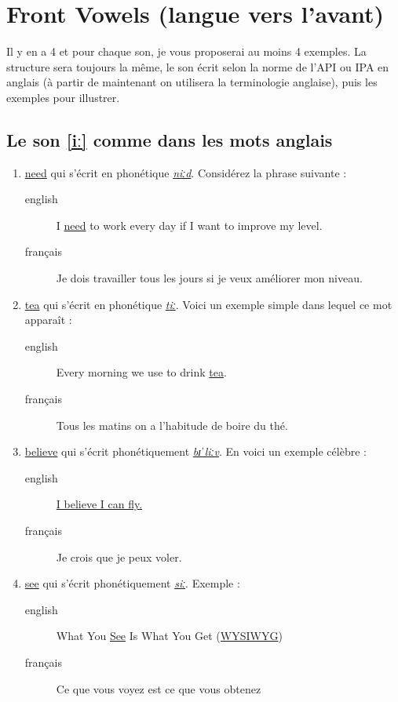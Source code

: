\documentclass[12pt,a4paper]{book}
\begin{document}
\section{\textenglish{Front Vowels} (langue vers l'avant)}
\label{sec:orge433061}
Il y en a 4 et pour chaque son, je vous proposerai au moins 4
exemples. La structure sera toujours la même, le son écrit selon la
norme de l'API ou IPA en anglais (à partir de maintenant on utilisera
la terminologie anglaise), puis les exemples pour illustrer.
\subsection{Le son \href{https://youtu.be/EuZa9-QbhG8}{[iː]} comme dans les mots anglais}
\label{sec:org62768e9}
\begin{enumerate}
\item \href{http://www.wordreference.com/enfr/need}{need} qui s'écrit en phonétique \href{https://en.oxforddictionaries.com/definition/need}{\emph{niːd}}. Considérez la
phrase suivante :
\begin{description}
\item[{english}] \textenglish{I \href{https://youtu.be/p0quLJutRC8}{need} to work every day if I want to improve my level.}
\item[{français}] Je dois travailler tous les jours si je veux
améliorer mon niveau.
\end{description}
\item \href{http://www.wordreference.com/enfr/tea}{tea} qui s'écrit en phonétique \href{https://en.oxforddictionaries.com/definition/tea}{\emph{tiː}}. Voici un exemple simple dans
lequel ce mot apparaît :
\begin{description}
\item[{english}] \textenglish{Every morning we use to drink \href{https://youtu.be/Euh8dY4EU9o}{tea}.}
\item[{français}] Tous les matins on a l'habitude de boire du thé.
\end{description}
\item \href{http://www.wordreference.com/enfr/believe}{believe} qui s'écrit phonétiquement \href{https://en.oxforddictionaries.com/definition/believe}{\emph{bɪˈliːv}}. En voici un exemple
célèbre :
\begin{description}
\item[{english}] \href{https://youtu.be/GIQn8pab8Vc}{\textenglish{I believe I can fly.}}
\item[{français}] Je crois que je peux voler.
\end{description}
\item \href{http://www.wordreference.com/enfr/see}{see} qui s'écrit phonétiquement \href{https://en.oxforddictionaries.com/definition/see}{\emph{siː}}. Exemple :
\begin{description}
\item[{english}] \textenglish{What You \href{https://youtu.be/Dpf2yHjBVYM}{See} Is What You Get (\href{https://fr.wikipedia.org/wiki/What\_you\_see\_is\_what\_you\_get}{WYSIWYG})}
\item[{français}] Ce que vous voyez est ce que vous obtenez
\end{description}
\end{enumerate}
\end{document}
